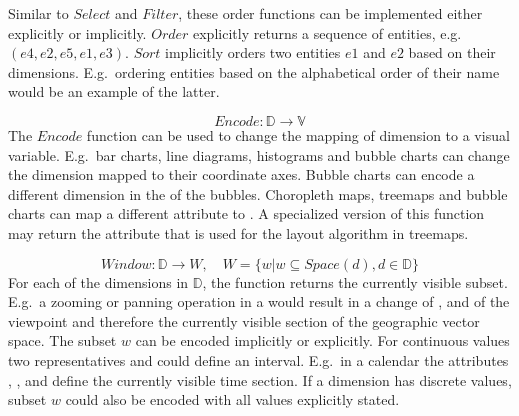   Similar to $Select$ and $Filter$, these order functions can be implemented either explicitly or implicitly.
  $Order$ explicitly returns a sequence of entities, e.g.\ $(e4, e2, e5, e1, e3)$.
  $Sort$ implicitly orders two entities $e1$ and $e2$ based on their dimensions.
  E.g.\ ordering entities based on the alphabetical order of their name would be an example of the latter.

\begin{equation} Encode: \mathbb{D} \rightarrow \mathbb{V} \end{equation}
  The $Encode$ function can be used to change the mapping of dimension to a visual variable.
  E.g.\ bar charts, line diagrams, histograms and bubble charts can change the dimension mapped to their coordinate axes.
  Bubble charts can encode a different dimension in the  of the bubbles.
  Choropleth maps, treemaps and bubble charts can map a different attribute to .
  A specialized version of this function may return the attribute that is used for the layout algorithm in treemaps.

\begin{equation} Window: \mathbb{D} \rightarrow W, \quad W = \{w | w \subseteq Space(d), d \in \mathbb{D}\} \end{equation}
  For each of the dimensions in $\mathbb{D}$, the function returns the currently visible subset.
  E.g.\ a zooming or panning operation in a \gv{} would result in a change of ,  and  of the viewpoint and therefore the currently visible section of the geographic vector space.
  The subset $w$ can be encoded implicitly or explicitly.
  For continuous values two representatives  and  could define an interval.
  E.g.\ in a calendar the attributes , ,  and  define the currently visible time section.
  If a dimension has discrete values, subset $w$ could also be encoded with all values explicitly stated.


